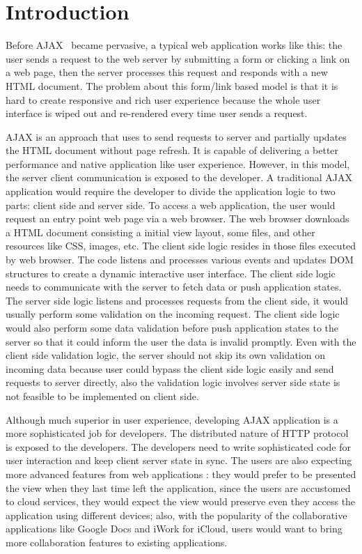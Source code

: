 \section{Introduction}
\label{sec:intro}

Before AJAX~\cite{garrett2005ajax} became pervasive, a typical web application works like this:
the user sends a request to the web server by submitting a form or clicking a link on a web page,
then the server processes this request and responds with a new HTML document.
The problem about this form/link based model is that it is hard
to create responsive and rich user experience because the whole user interface
is wiped out and re-rendered every time user sends a request.

AJAX is an approach that uses \js{} to send requests to server
and partially updates the HTML document without page refresh.
It is capable of delivering a better performance and native application like user experience.
However, in this model, the server client communication is exposed to the developer.
A traditional AJAX application would require the developer to divide the application logic to two parts: 
client side and server side. 
To access a web application, the user would request an entry point web page via a web browser.
The web browser downloads a HTML document consisting a initial view layout,
 some \js{} files, and other resources like CSS, images, etc.
The client side logic resides in those \js{} files executed by web browser.
The \js{} code listens and processes various events and
updates DOM structures to create a dynamic interactive user interface.
The client side logic needs to communicate with the server to fetch data
or push application states.
The server side logic listens and processes requests from the client side,
it would usually perform some validation on the incoming request.
The client side logic would also perform some data validation before push
application states to the server so that it could inform the user the data 
is invalid promptly.
Even with the client side validation logic, the server should not skip its own validation on incoming data 
because user could bypass the client side logic easily and send requests to server directly, 
also the validation logic involves server side state is not feasible to be implemented on client side.

Although much superior in user experience, 
developing AJAX application is a more sophisticated job for developers.
The distributed nature of HTTP protocol is exposed to the developers.
The developers need to write sophisticated \js{} code for user interaction
and keep client server state in sync.
The users are also expecting more advanced features from web applications :
they would prefer to be presented the view when they last time left the application,
since the users are accustomed to cloud services, 
they would expect the view would preserve even they access the application
using different devices;
also, with the popularity of the collaborative applications like Google Docs 
and iWork for iCloud, 
users would want to bring more collaboration features to existing applications.


